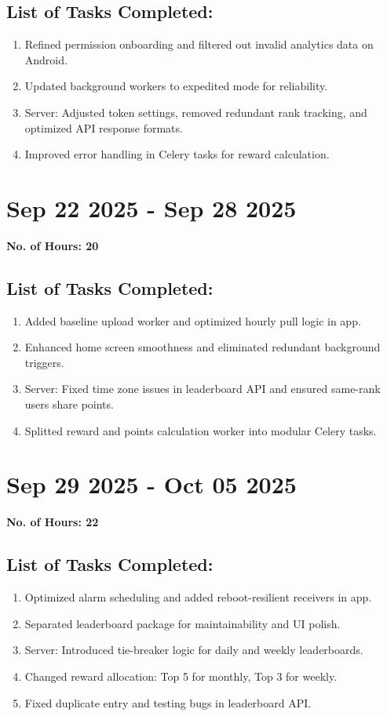 \documentclass[12pt]{article}
\begin{document}
    \subsection{List of Tasks Completed:}
    \begin{enumerate}
        \item Refined permission onboarding and filtered out invalid analytics data on Android.
        \item Updated background workers to expedited mode for reliability.
        \item Server: Adjusted token settings, removed redundant rank tracking, and optimized API response formats.
        \item Improved error handling in Celery tasks for reward calculation.
    \end{enumerate}
    
    \section{Sep 22 2025 - Sep 28 2025}
    {\bf No. of Hours: 20}
    \subsection{List of Tasks Completed:}
    \begin{enumerate}
        \item Added baseline upload worker and optimized hourly pull logic in app.
        \item Enhanced home screen smoothness and eliminated redundant background triggers.
        \item Server: Fixed time zone issues in leaderboard API and ensured same-rank users share points.
        \item Splitted reward and points calculation worker into modular Celery tasks.
    \end{enumerate}
    
    \section{Sep 29 2025 - Oct 05 2025}
    {\bf No. of Hours: 22}
    \subsection{List of Tasks Completed:}
    \begin{enumerate}
        \item Optimized alarm scheduling and added reboot-resilient receivers in app.
        \item Separated leaderboard package for maintainability and UI polish.
        \item Server: Introduced tie-breaker logic for daily and weekly leaderboards.
        \item Changed reward allocation: Top 5 for monthly, Top 3 for weekly.
        \item Fixed duplicate entry and testing bugs in leaderboard API.
    \end{enumerate}
    
\end{document}
